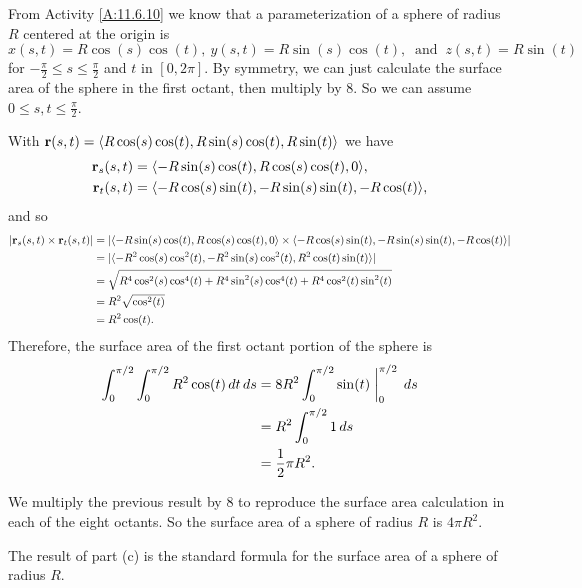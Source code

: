 \begin{exercises}
\begin{exerciseSolution}
\ba
\item From Activity \ref{A:11.6.10} we know that a parameterization of a sphere of radius $R$ centered at the origin is 
\[x(s,t) = R \cos(s) \cos(t), \ y(s,t) = R\sin(s) \cos(t), \ \text{ and } \ z(s,t) = R \sin(t)\]
for $-\frac{\pi}{2} \leq s \leq \frac{\pi}{2}$ and $t$ in $[0, 2 \pi]$. By symmetry, we can just calculate the surface area of the sphere in the first octant, then multiply by 8. So we can assume $0 \leq s, t \leq \frac{\pi}{2}$.
\item With $\mathbf{r}(s,t) = \langle R \cos(s) \cos(t),  R\sin(s) \cos(t),  R \sin(t) \rangle$ we have
\begin{align*}
\mathbf{r}_s(s,t) &= \langle -R\sin(s) \cos(t), R\cos(s)\cos(t), 0 \rangle, \\
\mathbf{r}_t(s,t) &= \langle -R\cos(s) \sin(t), -R\sin(s)\sin(t), -R\cos(t) \rangle,
\end{align*}
and so 
\begin{align*}
\lvert \mathbf{r}_s(s,t) \times \mathbf{r}_t(s,t) \rvert &= \lvert \langle -R\sin(s) \cos(t), R\cos(s)\cos(t), 0 \rangle \times \langle -R\cos(s) \sin(t), -R\sin(s)\sin(t), -R\cos(t) \rangle \rvert \\
    &= \lvert \langle -R^2\cos(s)\cos^2(t), -R^2\sin(s)\cos^2(t), R^2\cos(t)\sin(t) \rangle \rvert \\
    &= \sqrt{R^4\cos^2(s)\cos^4(t) + R^4\sin^2(s)\cos^4(t) + R^4\cos^2(t)\sin^2(t)} \\
    &= R^2\sqrt{\cos^2(t)} \\
    &= R^2\cos(t).
\end{align*}
Therefore, the surface area of the first octant portion of the sphere is
\begin{align*}
 \int_0^{\pi/2} \int_0^{\pi/2} R^2 \cos(t) \, dt \, ds &= 8R^2 \int_0^{\pi/2} \sin(t) \biggm|_0^{\pi/2} \, ds \\
    &= R^2 \int_0^{\pi/2} 1 \, ds \\
    &= \frac{1}{2}\pi R^2.
\end{align*}
\item We multiply the previous result by 8 to reproduce the surface area calculation in each of the eight octants. So the surface area of a sphere of radius $R$ is $4 \pi R^2$. 
\item  The result of part (c) is the standard formula for the surface area of a sphere of radius $R$. 
\ea
\end{exerciseSolution}


\end{exercises}
